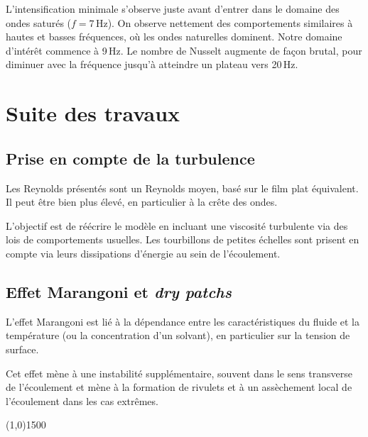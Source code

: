 \documentclass[a0,portrait]{a0poster}
\begin{document}
\begin{multicols}{2}
\begin{multicols}{2}
        L'intensification minimale s'observe juste avant d'entrer dans le domaine des ondes saturés ($f=7\,\mathrm{Hz}$). On observe nettement des comportements similaires à hautes et basses fréquences, où les ondes naturelles dominent. Notre domaine d’intérêt commence à 9\,Hz. Le nombre de Nusselt augmente de façon brutal, pour diminuer avec la fréquence jusqu'à atteindre un plateau vers 20\,Hz.

    \end{multicols}

    \section*{Suite des travaux}

    \begin{multicols}{2}
        \subsection*{Prise en compte de la turbulence}
        Les Reynolds présentés sont un Reynolds moyen, basé sur le film plat équivalent. Il peut être bien plus élevé, en particulier à la crête des ondes.

        L'objectif est de réécrire le modèle en incluant une viscosité turbulente via des lois de comportements usuelles. Les tourbillons de petites échelles sont prisent en compte via leurs dissipations d'énergie au sein de l'écoulement.

        \columnbreak

        \subsection*{Effet Marangoni et \emph{dry patchs}}
        L'effet Marangoni est lié à la dépendance entre les caractéristiques du fluide et la température (ou la concentration d'un solvant), en particulier sur la tension de surface.

        Cet effet mène à une instabilité supplémentaire, souvent dans le sens transverse de l'écoulement et mène à la formation de rivulets et à un assèchement local de l'écoulement dans les cas extrêmes.

    \end{multicols}

\end{multicols}

\begin{center}
    \line(1,0){1500}
\end{center}
\end{document}
